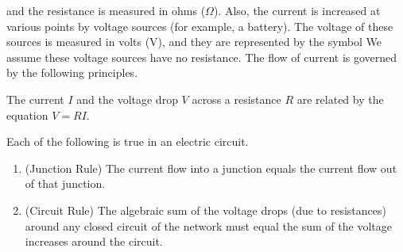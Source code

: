 \documentclass{ximera}
\begin{document}



and the resistance is measured in ohms ($\Omega$). Also, the current is increased at various points by voltage sources (for example, a battery). The voltage of these sources is measured in volts (V), and they are represented by the symbol 
We assume these voltage sources have no resistance. The flow of current is governed by the following principles.

\begin{theorem}\label{001806}

The current $I$ and the voltage drop $V$ across a resistance $R$ are related by the equation $V = RI$.

\end{theorem}

\begin{theorem}\label{001809}
    Each of the following is true in an electric circuit.
\begin{enumerate}
    \item\label{item:001809j}(Junction Rule) The current flow into a junction equals the current flow out of that junction.
    \item\label{item:001809c}(Circuit Rule) The algebraic sum of the voltage drops (due to resistances) around any closed circuit of the network must equal the sum of the voltage increases around the circuit.
\end{enumerate}

\end{theorem}
\end{document}
